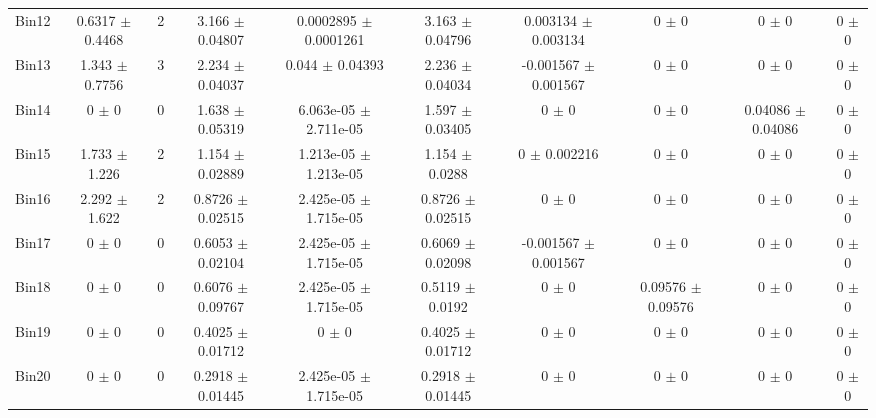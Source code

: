 \begin{tabular}{@{\extracolsep{4pt}}lccccccccc@{}}
     Bin12 & 0.6317 $\pm$ 0.4468 & 2 & 3.166 $\pm$ 0.04807 & 0.0002895 $\pm$ 0.0001261 & 3.163 $\pm$ 0.04796 & 0.003134 $\pm$ 0.003134 & 0 $\pm$ 0 & 0 $\pm$ 0 & 0 $\pm$ 0 \\ 
     Bin13 & 1.343 $\pm$ 0.7756 & 3 & 2.234 $\pm$ 0.04037 & 0.044 $\pm$ 0.04393 & 2.236 $\pm$ 0.04034 & -0.001567 $\pm$ 0.001567 & 0 $\pm$ 0 & 0 $\pm$ 0 & 0 $\pm$ 0 \\ 
     Bin14 & 0 $\pm$ 0 & 0 & 1.638 $\pm$ 0.05319 & 6.063e-05 $\pm$ 2.711e-05 & 1.597 $\pm$ 0.03405 & 0 $\pm$ 0 & 0 $\pm$ 0 & 0.04086 $\pm$ 0.04086 & 0 $\pm$ 0 \\ 
     Bin15 & 1.733 $\pm$ 1.226 & 2 & 1.154 $\pm$ 0.02889 & 1.213e-05 $\pm$ 1.213e-05 & 1.154 $\pm$ 0.0288 & 0 $\pm$ 0.002216 & 0 $\pm$ 0 & 0 $\pm$ 0 & 0 $\pm$ 0 \\ 
     Bin16 & 2.292 $\pm$ 1.622 & 2 & 0.8726 $\pm$ 0.02515 & 2.425e-05 $\pm$ 1.715e-05 & 0.8726 $\pm$ 0.02515 & 0 $\pm$ 0 & 0 $\pm$ 0 & 0 $\pm$ 0 & 0 $\pm$ 0 \\ 
     Bin17 & 0 $\pm$ 0 & 0 & 0.6053 $\pm$ 0.02104 & 2.425e-05 $\pm$ 1.715e-05 & 0.6069 $\pm$ 0.02098 & -0.001567 $\pm$ 0.001567 & 0 $\pm$ 0 & 0 $\pm$ 0 & 0 $\pm$ 0 \\ 
     Bin18 & 0 $\pm$ 0 & 0 & 0.6076 $\pm$ 0.09767 & 2.425e-05 $\pm$ 1.715e-05 & 0.5119 $\pm$ 0.0192 & 0 $\pm$ 0 & 0.09576 $\pm$ 0.09576 & 0 $\pm$ 0 & 0 $\pm$ 0 \\ 
     Bin19 & 0 $\pm$ 0 & 0 & 0.4025 $\pm$ 0.01712 & 0 $\pm$ 0 & 0.4025 $\pm$ 0.01712 & 0 $\pm$ 0 & 0 $\pm$ 0 & 0 $\pm$ 0 & 0 $\pm$ 0 \\ 
     Bin20 & 0 $\pm$ 0 & 0 & 0.2918 $\pm$ 0.01445 & 2.425e-05 $\pm$ 1.715e-05 & 0.2918 $\pm$ 0.01445 & 0 $\pm$ 0 & 0 $\pm$ 0 & 0 $\pm$ 0 & 0 $\pm$ 0 \\ 
\hline\hline
  \end{tabular}
